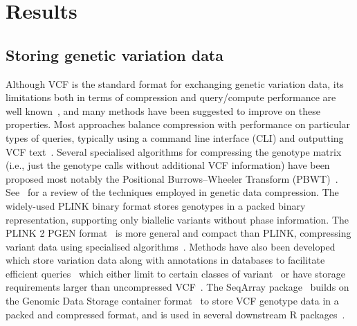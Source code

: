 \documentclass[a4paper,num-refs]{oup-contemporary}
\begin{document}
\section{Results}

\subsection{Storing genetic variation data}
Although VCF is the standard format for exchanging genetic variation
data, its limitations both in terms of compression 
and query/compute performance are well 
known~\citep[e.g.][]{kelleher2013processing,layer2016efficient,li2016bgt},
and many methods 
have been suggested to improve on these properties.
Most approaches balance compression with
performance on particular types of queries, 
typically using a command line interface (CLI)
and outputting VCF text~\citep{
layer2016efficient, %
li2016bgt, %
tatwawadi2016gtrac, %
danek2018gtc, %
lin2020sparse, %
lan2020genozip,lan2021genozip, %
lefaive2021sparse, %
wertenbroek2022xsi,%
zhang2023gbc}. %
Several specialised algorithms for compressing 
the genotype matrix (i.e., just the genotype calls without additional
VCF information) have been proposed
\citep{qiao2012handling, %
deorowicz2013genome, %
sambo2014compression, %
deorowicz2019gtshark, %
deorowicz2021vcfshark, %
dehaas2024genotype} %
most notably the Positional
Burrows--Wheeler Transform (PBWT)~\citep{durbin2014efficient}.
See~\citep{mcvean2019linkage} for a review of the techniques
employed in genetic data compression.
The widely-used PLINK binary format stores genotypes in a 
packed binary representation, supporting only biallelic
variants without phase information.
The PLINK 2 PGEN format~\citep{pgen2024} is more general
and compact than PLINK, compressing variant data using specialised
algorithms~\cite{sambo2014compression}.
Methods have also been developed which store variation data 
along with annotations in databases to facilitate
efficient queries~\cite[e.g.][]{
paila2013gemini,%
lopez2017hgva} %
which either limit to certain classes of variant~\cite[e.g.][]{greene2023genetic}
or have storage requirements larger
than uncompressed VCF~\citep{al2023critical}. 
The SeqArray package~\citep{zheng2017seqarray} builds on the 
Genomic Data Storage container format~\cite{zheng2012high}
to store VCF genotype data in a packed and compressed format,
and is used in several downstream R packages~\cite[e.g.][]{
gogarten2019genetic,fernandes2020simplephenotypes}.
\end{document}
